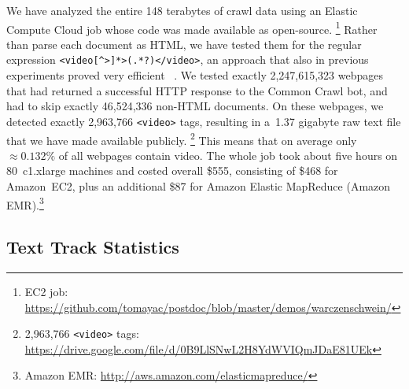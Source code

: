 \documentclass{sig-alternate}
\newcommand{\inlinelistingsize}{\fontsize{8pt}{11pt}}
\let\oldurl\url
\renewcommand{\url}[1]{\inlinelistingsize\oldurl{#1}}
\begin{document}
We have analyzed the entire 148 terabytes of crawl data
using an Elastic Compute Cloud job
whose code was made available as open-source.%
\footnote{EC2 job:
\url{https://github.com/tomayac/postdoc/blob/master/demos/warczenschwein/}}
Rather than parse each document as HTML,
we have tested them for the regular expression
\texttt{<video[\^{}>]*>(.*?)</video>},
an approach that also in previous experiments
proved very efficient%
~\cite{bizer2013deployment,muhleisen2012web}.
We tested exactly 2,247,615,323 webpages
that had returned a successful HTTP response to the Common Crawl bot,
and had to skip exactly 46,524,336  non-HTML documents.
On these webpages, we detected exactly
2,963,766 \texttt{<video>} tags,
resulting in a~1.37 gigabyte raw text file
that we have made available publicly.%
\footnote{2,963,766 \texttt{<video>} tags: \url{https://drive.google.com/file/d/0B9LlSNwL2H8YdWVIQmJDaE81UEk}}
This means that on average only ${\approx}0.132\%$ of all webpages contain video.
The whole job took about five hours on
80~c1.xlarge machines and costed overall \$555,
consisting of \$468 for Amazon~EC2,
plus an additional \$87 for Amazon Elastic MapReduce
 (Amazon EMR).\footnote{Amazon EMR:
\url{http://aws.amazon.com/elasticmapreduce/}}

\subsection{Text Track Statistics}
\label{sec:text-track-statistics}
\end{document}
